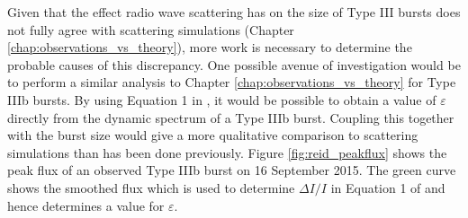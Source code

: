%
%
Given that the effect radio wave scattering has on the size of Type III bursts does not fully agree with scattering simulations (Chapter \ref{chap:observations_vs_theory}), more work is necessary to determine the probable causes of this discrepancy. One possible avenue of investigation would be to perform a similar analysis to Chapter \ref{chap:observations_vs_theory} for Type IIIb bursts. By using Equation 1 in \cite{Reid2021}, it would be possible to obtain a value of $\varepsilon$ directly from the dynamic spectrum of a Type IIIb burst. Coupling this together with the burst size would give a more qualitative comparison to scattering simulations than has been done previously. Figure \ref{fig:reid_peakflux} shows the peak flux of an observed Type IIIb burst on 16 September 2015. The green curve shows the smoothed flux which is used to determine $\Delta I/I$ in Equation 1 of \cite{Reid2021} and hence determines a value for $\varepsilon$.

